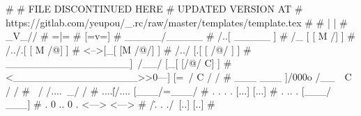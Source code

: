#
# FILE DISCONTINUED HERE
# UPDATED VERSION AT
#         https://gitlab.com/yeupou/_.rc/raw/master/templates/template.tex
#
#                                 |     |
#                                 \_V_//
#                                 \/=|=\/
#                                  [=v=]
#                                __\___/_____
#                               /..[  _____  ]
#                              /_  [ [  M /] ]
#                             /../.[ [ M /@] ]
#                            <-->[_[ [M /@/] ]
#                           /../ [.[ [ /@/ ] ]
#      _________________]\ /__/  [_[ [/@/ C] ]
#     <_________________>>0---]  [=\ \@/ C / /
#        ___      ___   ]/000o   /__\ \ C / /
#           \    /              /....\ \_/ /
#        ....\||/....           [___/=\___/
#       .    .  .    .          [...] [...]
#      .      ..      .         [___/ \___]
#      .    0 .. 0    .         <---> <--->
#   /\/\.    .  .    ./\/\      [..]   [..]
#






\label{lastpage}

